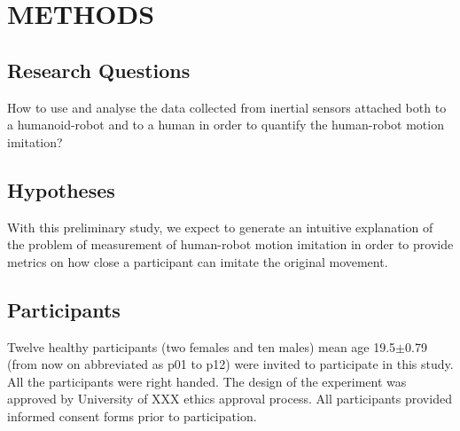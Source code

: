 \documentclass{sig-alternate-05-2015}
\begin{document}
% 
% 
% 







\section{METHODS}

\subsection{Research Questions}

How to use and analyse the data collected from inertial sensors attached  
both to a humanoid-robot and to a human in order to quantify the human-robot motion imitation?


\subsection{Hypotheses}
With this preliminary study, we expect to generate an intuitive 
explanation of the problem of measurement of human-robot motion imitation 
in order to provide metrics on how close a participant can imitate the original
movement.



\subsection{Participants}
Twelve healthy participants (two females and ten males)
mean age 19.5$\pm$0.79 (from now on abbreviated as p01 to p12) were invited to 
participate in this study. All the participants were right handed.
The design of the experiment was approved by University of XXX ethics approval
process. All participants provided informed consent forms prior to participation.
\end{document}
